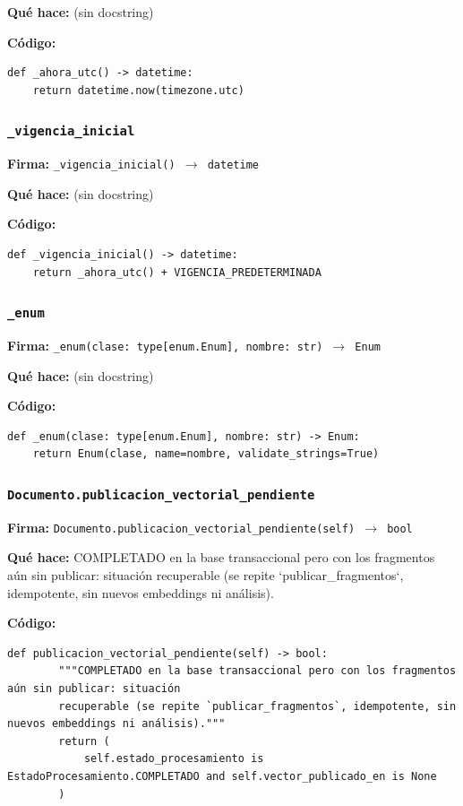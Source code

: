 \documentclass[11pt,a4paper]{article}
\begin{document}
\textbf{Qué hace:} (sin docstring)

\textbf{Código:}
\begin{lstlisting}
def _ahora_utc() -> datetime:
    return datetime.now(timezone.utc)
\end{lstlisting}

\subsubsection*{\texttt{\_vigencia\_inicial}}
\textbf{Firma:} \texttt{\_vigencia\_inicial() $\rightarrow$ datetime}

\textbf{Qué hace:} (sin docstring)

\textbf{Código:}
\begin{lstlisting}
def _vigencia_inicial() -> datetime:
    return _ahora_utc() + VIGENCIA_PREDETERMINADA
\end{lstlisting}

\subsubsection*{\texttt{\_enum}}
\textbf{Firma:} \texttt{\_enum(clase: type[enum.Enum], nombre: str) $\rightarrow$ Enum}

\textbf{Qué hace:} (sin docstring)

\textbf{Código:}
\begin{lstlisting}
def _enum(clase: type[enum.Enum], nombre: str) -> Enum:
    return Enum(clase, name=nombre, validate_strings=True)
\end{lstlisting}

\subsubsection*{\texttt{Documento.publicacion\_vectorial\_pendiente}}
\textbf{Firma:} \texttt{Documento.publicacion\_vectorial\_pendiente(self) $\rightarrow$ bool}

\textbf{Qué hace:} COMPLETADO en la base transaccional pero con los fragmentos aún sin publicar: situación
recuperable (se repite `publicar\_fragmentos`, idempotente, sin nuevos embeddings ni análisis).

\textbf{Código:}
\begin{lstlisting}
def publicacion_vectorial_pendiente(self) -> bool:
        """COMPLETADO en la base transaccional pero con los fragmentos aún sin publicar: situación
        recuperable (se repite `publicar_fragmentos`, idempotente, sin nuevos embeddings ni análisis)."""
        return (
            self.estado_procesamiento is EstadoProcesamiento.COMPLETADO and self.vector_publicado_en is None
        )
\end{lstlisting}
\end{document}
